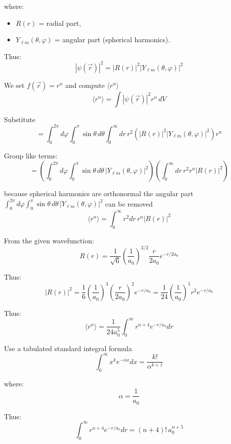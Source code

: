 \documentclass[12pt]{article}
\begin{document}
        where:
        \begin{itemize}
            \item \( R(r) \) = radial part,
            \item \( Y_{\ell m}(\theta, \varphi) \) = angular part (spherical harmonics).
        \end{itemize}

        Thus:
        \[
            |\psi(\vec{r})|^2 = |R(r)|^2 |Y_{\ell m}(\theta, \varphi)|^2
        \]

        We set \( f(\vec{r}) = r^n \) and compute \( \langle r^n \rangle \)
        \[
            \langle r^n \rangle = \int |\psi(\vec{r})|^2 r^n \, dV
        \]

        Substitute
        \[
            = \int_0^{2\pi} d\varphi \int_0^{\pi} \sin\theta \, d\theta \int_0^\infty dr \, r^2 \left( |R(r)|^2 |Y_{\ell m}(\theta, \varphi)|^2 \right) r^n
        \]

        Group like terms:
        \[
            = \left( \int_0^{2\pi} d\varphi \int_0^{\pi} \sin\theta \, d\theta \, |Y_{\ell m}(\theta, \varphi)|^2 \right)
            \left( \int_0^\infty dr \, r^2 r^n |R(r)|^2 \right)
        \]

        because spherical harmonics are orthonormal the angular part $\int_0^{2\pi} d\varphi \int_0^{\pi} \sin\theta \, d\theta \, |Y_{\ell m}(\theta, \varphi)|^2$ can be removed
        \[
            \langle r^n \rangle = \int_0^\infty r^2 dr \, r^n |R(r)|^2
        \]

        From the given wavefunction:
        \[
            R(r) = \frac{1}{\sqrt{6}} \left( \frac{1}{a_0} \right)^{3/2} \frac{r}{2a_0} e^{-r/2a_0}
        \]

        Thus:
        \[
            |R(r)|^2 = \frac{1}{6} \left( \frac{1}{a_0} \right)^3 \left( \frac{r}{2a_0} \right)^2 e^{-r/a_0}
            = \frac{1}{24} \left( \frac{1}{a_0} \right)^5 r^2 e^{-r/a_0}
        \]

        Thus:
        \[
        \langle r^n \rangle = \frac{1}{24 a_0^5} \int_0^\infty r^{n+4} e^{-r/a_0} dr
        \]
        
        Use a tabulated standard integral formula
        \[
            \int_0^\infty x^k e^{-\alpha x} dx = \frac{k!}{\alpha^{k+1}}
        \]

        where:
        \[
            \alpha = \frac{1}{a_0}
        \]

        Thus:
        \[
        \int_0^\infty r^{n+4} e^{-r/a_0} dr = (n+4)! \, a_0^{n+5}
        \]
\end{document}
